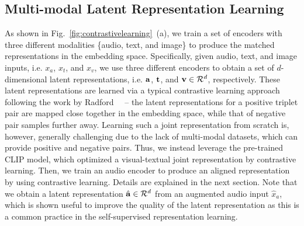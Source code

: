 \documentclass[10pt,twocolumn,letterpaper]{article}
\def\authornote#1#2#3{{\textcolor{#2}{\textsl{\small[#1: #3]}}}}
\newcommand{\wonmin}[1]{\authornote{Wonmin}{Blue}{#1}} %
\begin{document}
\subsection{Multi-modal Latent Representation Learning}
As shown in Fig.~\ref{fig:contrastivelearning}~(a), we train a set of encoders with three different modalities \{audio, text, and image\} to produce the matched representations in the embedding space. Specifically, given audio, text, and image inputs, i.e. $x_a$, $x_t$, and $x_v$, we use three different encoders to obtain a set of $d$-dimensional latent representations, i.e. $\bf{a}$, $\bf{t}$, and ${\bf{v}}\in\mathcal{R}^{d}$, respectively. These latent representations are learned via a typical contrastive learning approach following the work by Radford~\etal~\cite{radford2learning} -- the latent representations for a positive triplet pair are mapped close together in the embedding space, while that of negative pair samples further away. Learning such a joint representation from scratch is, however, generally challenging due to the lack of multi-modal datasets, which can provide positive and negative pairs. Thus, we instead leverage the pre-trained CLIP model, which optimized a visual-textual joint representation by contrastive learning. Then, we train an audio encoder to produce an aligned representation by using contrastive learning. Details are explained in the next section. Note that we obtain a latent representation $\hat{{\bf{a}}}\in\mathcal{R}^{d}$ from an augmented audio input $\hat{x}_a$, which is shown useful to improve the quality of the latent representation as this is a common practice in the self-supervised representation learning. %

\end{document}
